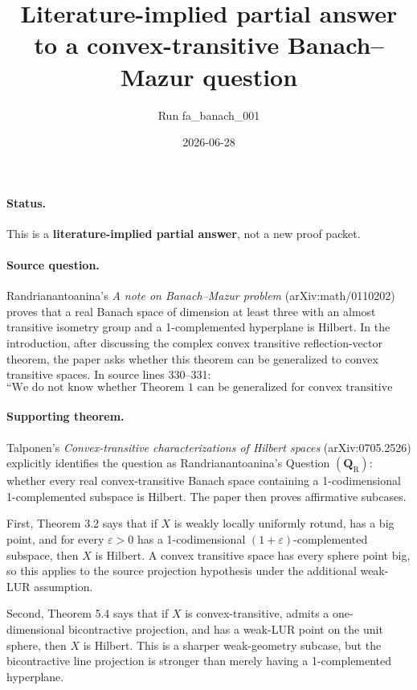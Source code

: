 \documentclass[11pt]{article}
\title{Literature-implied partial answer to a convex-transitive Banach--Mazur question}
\author{Run fa\_banach\_001}
\date{2026-06-28}
\begin{document}
\maketitle

\paragraph{Status.}
This is a \textbf{literature-implied partial answer}, not a new proof packet.

\paragraph{Source question.}
Randrianantoanina's \emph{A note on Banach--Mazur problem}
(arXiv:math/0110202) proves that a real Banach space of dimension at least
three with an almost transitive isometry group and a 1-complemented hyperplane
is Hilbert.  In the introduction, after discussing the complex convex
transitive reflection-vector theorem, the paper asks whether this theorem can
be generalized to convex transitive spaces.  In source lines 330--331:
\[
\text{``We do not know whether Theorem 1 can be generalized for convex transitive spaces.''}
\]

\paragraph{Supporting theorem.}
Talponen's \emph{Convex-transitive characterizations of Hilbert spaces}
(arXiv:0705.2526) explicitly identifies the question as Randrianantoanina's
Question \((\mathbf Q_{\mathrm R})\): whether every real convex-transitive
Banach space containing a 1-codimensional 1-complemented subspace is Hilbert.
The paper then proves affirmative subcases.

First, Theorem 3.2 says that if \(X\) is weakly locally uniformly rotund,
has a big point, and for every \(\varepsilon>0\) has a 1-codimensional
\((1+\varepsilon)\)-complemented subspace, then \(X\) is Hilbert.  A convex
transitive space has every sphere point big, so this applies to the source
projection hypothesis under the additional weak-LUR assumption.

Second, Theorem 5.4 says that if \(X\) is convex-transitive, admits a
one-dimensional bicontractive projection, and has a weak-LUR point on the unit
sphere, then \(X\) is Hilbert.  This is a sharper weak-geometry subcase, but
the bicontractive line projection is stronger than merely having a
1-complemented hyperplane.
\end{document}
